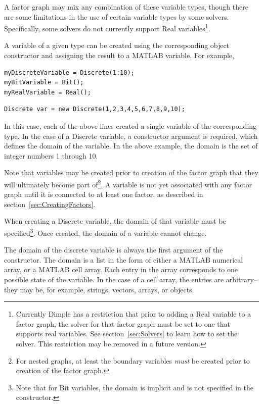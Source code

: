 A factor graph may mix any combination of these variable types, though there are some limitations in the use of certain variable types by some solvers.  Specifically, some solvers do not currently support Real variables\footnote{Currently Dimple has a restriction that prior to adding a Real variable to a factor graph, the solver for that factor graph must be set to one that supports real variables.  See section~\ref{sec:Solvers} to learn how to set the solver.  This restriction may be removed in a future version.}.

A variable of a given type can be created using the corresponding object constructor and assigning the result to a MATLAB variable.  For example,

\ifmatlab

\begin{lstlisting}
myDiscreteVariable = Discrete(1:10);
myBitVariable = Bit();
myRealVariable = Real();
\end{lstlisting}

\fi

\ifjava
\begin{lstlisting}
Discrete var = new Discrete(1,2,3,4,5,6,7,8,9,10);
\end{lstlisting}
\fi

In this case, each of the above lines created a single variable of the corresponding type.  In the case of a Discrete variable, a constructor argument is required, which defines the domain of the variable.  In the above example, the domain is the set of integer numbers 1 through 10.

Note that variables may be created prior to creation of the factor graph that they will ultimately become part of\footnote{For nested graphs, at least the boundary variables \emph{must} be created prior to creation of the factor graph.}.  A variable is not yet associated with any factor graph until it is connected to at least one factor, as described in section~\ref{sec:CreatingFactors}.




When creating a Discrete variable, the domain of that variable must be specified\footnote{Note that for Bit variables, the domain is implicit and is not specified in the constructor.}.  Once created, the domain of a variable cannot change.  

\ifmatlab

The domain of the discrete variable is always the first argument of the constructor.  The domain is a list in the form of either a MATLAB numerical array, or a MATLAB cell array.  Each entry in the array corresponds to one possible state of the variable.  In the case of a cell array, the entries are arbitrary--they may be, for example, strings, vectors, arrays, or objects.

